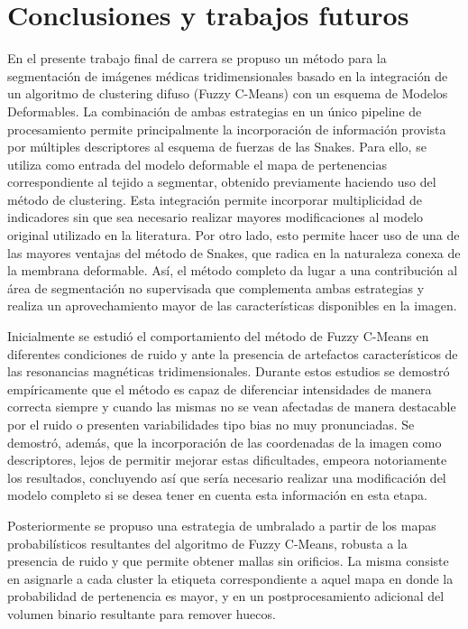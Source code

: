 \chapter{Conclusiones y trabajos futuros}
En el presente trabajo final de carrera se propuso un método para la segmentación de imágenes médicas tridimensionales basado en la integración de un algoritmo de clustering difuso (Fuzzy C-Means) con un esquema de Modelos Deformables. La combinación de ambas estrategias en un único pipeline de procesamiento permite principalmente la incorporación de información provista por múltiples descriptores al esquema de fuerzas de las Snakes. Para ello, se utiliza como entrada del modelo deformable el mapa de pertenencias correspondiente al tejido a segmentar, obtenido previamente haciendo uso del método de clustering. Esta integración permite incorporar multiplicidad de indicadores sin que sea necesario realizar mayores modificaciones al modelo original utilizado en la literatura. Por otro lado, esto permite hacer uso de una de las mayores ventajas del método de Snakes, que radica en la naturaleza conexa de la membrana deformable. Así, el método completo da lugar a una contribución al área de segmentación no supervisada que complementa ambas estrategias y realiza un aprovechamiento mayor de las características disponibles en la imagen.

Inicialmente se estudió el comportamiento del método de Fuzzy C-Means en diferentes condiciones de ruido y ante la presencia de artefactos característicos de las resonancias magnéticas tridimensionales. Durante estos estudios se demostró empíricamente que el método es capaz de diferenciar intensidades de manera correcta siempre y cuando las mismas no se vean afectadas de manera destacable por el ruido o presenten variabilidades tipo bias no muy pronunciadas. Se demostró, además, que la incorporación de las coordenadas de la imagen como descriptores, lejos de permitir mejorar estas dificultades, empeora notoriamente los resultados, concluyendo así que sería necesario realizar una modificación del modelo completo si se desea tener en cuenta esta información en esta etapa.

Posteriormente se propuso una estrategia de umbralado a partir de los mapas probabilísticos resultantes del algoritmo de Fuzzy C-Means, robusta a la presencia de ruido y que permite obtener mallas sin orificios. La misma consiste en asignarle a cada cluster la etiqueta correspondiente a aquel mapa en donde la probabilidad de pertenencia es mayor, y en un postprocesamiento adicional del volumen binario resultante para remover huecos.

